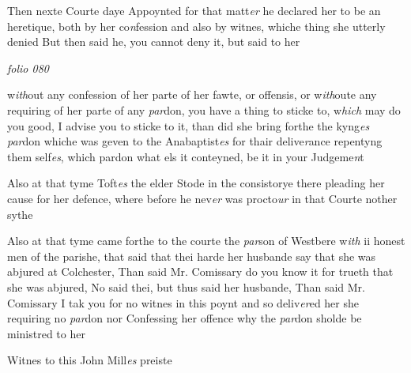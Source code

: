 \documentclass[12pt, a4paper]{book}
\begin{document}
		\ifthenelse{\isodd{\thepage}}
		{\reversemarginpar}
		{\normalmarginpar}
		Then nexte Courte daye Appoynted for that matt\textit{er}
 he declared her to be an heretique, both by her co\textit{n}fession
 and also by witnes, whiche thing she utterly denied
 But then said he, you cannot deny it, but said to her


\dotfill
						\newpage
{}

\textit{folio 080}


	
		
				\marginpar[\vspace{0.5cm}{\textcolor{Gray}{n}}]{}
			
		
		\ifthenelse{\isodd{\thepage}}
		{\reversemarginpar}
		{\normalmarginpar}
		w\textit{ith}out any confession of her parte of her fawte, or
 offensis, or w\textit{ith}oute any requiring of her parte of any
 \textit{par}don, you have a thing to sticke to, w\textit{hich} may do you
 good, I advise you to sticke to it, than did she bring
 forthe the kyng\textit{es}
               \textit{par}don whiche was geven to the
  Anabaptist\textit{es} for thair delive\textit{r}ance repentyng them
 self\textit{es}, which pardon what els it conteyned, be it
 in your Judgeme\textit{n}t
		
		\ifthenelse{\isodd{\thepage}}
		{\reversemarginpar}
		{\normalmarginpar}
		Also at that tyme Toft\textit{es} the elder Stode in the
			consistorye there pleading her cause for her
			defence, where before he nev\textit{er} was procto\textit{ur} in that
			Courte nother sythe
	
 

	
		\ifthenelse{\isodd{\thepage}}
		{\reversemarginpar}
		{\normalmarginpar}
		 Also at that tyme came forthe to the courte the \textit{par}son
 of Westbere w\textit{ith} ii honest men of the parishe, that
 said that thei harde her husbande say that she was
 abjured at Colchester, Than said Mr. Comissary do
 you know it for trueth that she was abjured, No
 said thei, but thus said her husbande, Than said Mr. Comissary I tak you for no witnes in this poynt
 and so deliv\textit{er}ed her she requiring no \textit{par}don nor
 Confessing her offence why the\textit{ par}don sholde be
 ministred to her

	
		
				\marginpar[\vspace{0.5cm}{\textcolor{Gray}{+}}]{}
			
		
		\ifthenelse{\isodd{\thepage}}
		{\reversemarginpar}
		{\normalmarginpar}
		Witnes to this John Mill\textit{es} preiste
	
\end{document}
